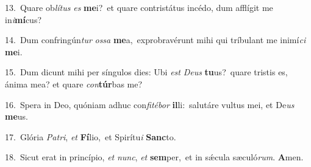 {\numbfont\textcolor{\numbcolor}{13.}}~Quare ob\-\textit{lí}\-\textit{tus} \textit{es} \textbf{me}\-i?~\star et quare contristátus incédo, dum afflígit me in\-\textit{i}\-\textbf{mí}cus?\par
{\numbfont\textcolor{\numbcolor}{14.}}~Dum confringún\textit{tur} \textit{os}\-\textit{sa} \textbf{me}\-a,~\star exprobravérunt mihi qui tríbulant me inimí\textit{ci} \textbf{me}\-i.\par
{\numbfont\textcolor{\numbcolor}{15.}}~Dum dicunt mihi per síngulos dies: Ubi \textit{est} \textit{De}\-\textit{us} \textbf{tu}\-us?~\star quare tristis es, ánima mea? et quare \textit{con}\-\textbf{túr}bas me?\par
{\numbfont\textcolor{\numbcolor}{16.}}~Spera in Deo, quóniam adhuc con\-\textit{fi}\-\textit{té}\textit{bor} \textbf{il}\-li:~\star salutáre vultus mei, et De\textit{us} \textbf{me}\-us.\par
{\numbfont\textcolor{\numbcolor}{17.}}~Glória \textit{Pa}\-\textit{tri}, \textit{et} \textbf{Fí}\-lio,~\star et Spirítu\textit{i} \textbf{Sanc}\-to.\par
{\numbfont\textcolor{\numbcolor}{18.}}~Sicut erat in princípio, \textit{et} \textit{nunc}\-, \textit{et} \textbf{sem}\-per,~\star et in sǽcula sæculó\-\textit{rum}\-. \textbf{A}\-men.\par
